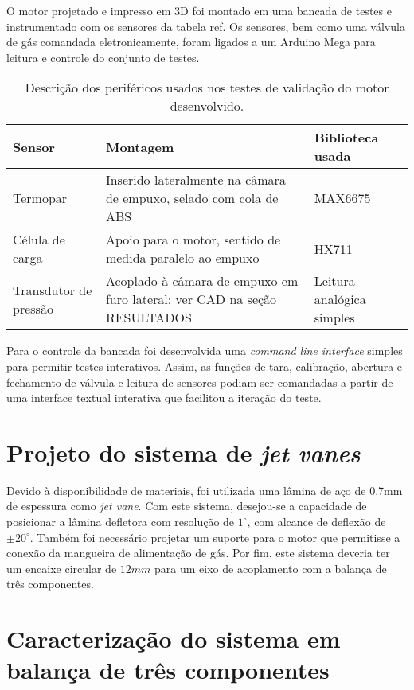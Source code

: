 O motor projetado e impresso em 3D foi montado em uma bancada de testes e instrumentado com os sensores da tabela ref. Os sensores, bem como uma válvula de gás comandada eletronicamente, foram ligados a um Arduino Mega para leitura e controle do conjunto de testes. 


\begin{table}[htbp]
    \centering\begin{tabular}{p{}p{}p{}} \toprule
        Sensor & Montagem & Biblioteca usada \\ \midrule
        Termopar & Inserido lateralmente na câmara de empuxo, selado com cola de ABS & MAX6675 \\
        Célula de carga & Apoio para o motor, sentido de medida paralelo ao empuxo & HX711 \\
        Transdutor de pressão & Acoplado à câmara de empuxo em furo lateral; ver CAD na seção RESULTADOS & Leitura analógica simples \\ \bottomrule
    \end{tabular}
    \caption{Descrição dos periféricos usados nos testes de validação do motor desenvolvido.}
    \label{tab:validation_peripherals}
\end{table}

Para o controle da bancada foi desenvolvida uma \textit{command line interface} simples para permitir testes interativos. Assim, as funções de tara, calibração, abertura e fechamento de válvula e leitura de sensores podiam ser comandadas a partir de uma interface textual interativa que facilitou a iteração do teste.

\section{Projeto do sistema de \textit{jet vanes}}

Devido à disponibilidade de materiais, foi utilizada uma lâmina de aço de 0,7mm de espessura como \textit{jet vane}. Com este sistema, desejou-se a capacidade de posicionar a lâmina defletora com resolução de \(1^\circ \), com alcance de deflexão de \(\pm 20^\circ \). Também foi necessário projetar um suporte para o motor que permitisse a conexão da mangueira de alimentação de gás. Por fim, este sistema deveria ter um encaixe circular de \(12mm\) para um eixo de acoplamento com a balança de três componentes.

\section{Caracterização do sistema em balança de três componentes}
